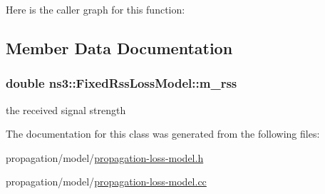 Here is the caller graph for this function\+:




\subsection{Member Data Documentation}
\subsubsection[{\texorpdfstring{m\+\_\+rss}{m_rss}}]{\setlength{\rightskip}{0pt plus 5cm}double ns3\+::\+Fixed\+Rss\+Loss\+Model\+::m\+\_\+rss\hspace{0.3cm}{\ttfamily [private]}}\hypertarget{classns3_1_1FixedRssLossModel_a11f042689e5bc560a89be05ad550da82}{}\label{classns3_1_1FixedRssLossModel_a11f042689e5bc560a89be05ad550da82}


the received signal strength 



The documentation for this class was generated from the following files\+:\begin{DoxyCompactItemize}
\item 
propagation/model/\hyperlink{propagation-loss-model_8h}{propagation-\/loss-\/model.\+h}\item 
propagation/model/\hyperlink{propagation-loss-model_8cc}{propagation-\/loss-\/model.\+cc}\end{DoxyCompactItemize}

